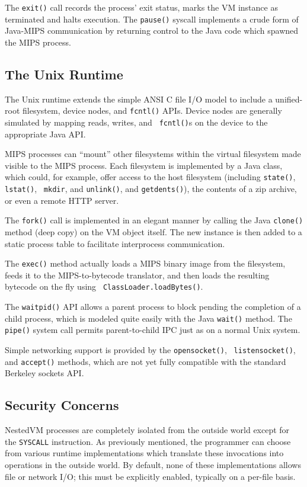 \documentclass{acmconf}
\begin{document}
The {\tt exit()} call records the process' exit status, marks the VM
instance as terminated and halts execution.  The {\tt pause()} syscall
implements a crude form of Java-MIPS communication by returning
control to the Java code which spawned the MIPS process.


\subsection{The Unix Runtime}

The Unix runtime extends the simple ANSI C file I/O model to include a
unified-root filesystem, device nodes, and {\tt fcntl()} APIs.  Device
nodes are generally simulated by mapping reads, writes, and {\tt
fcntl()}s on the device to the appropriate Java API.

MIPS processes can ``mount'' other filesystems within the virtual
filesystem made visible to the MIPS process.  Each filesystem is
implemented by a Java class, which could, for example, offer access to
the host filesystem (including {\tt state()}, {\tt lstat()}, {\tt
mkdir}, and {\tt unlink()}, and {\tt getdents()}), the contents of a
zip archive, or even a remote HTTP server.

The {\tt fork()} call is implemented in an elegant manner by calling
the Java {\tt clone()} method (deep copy) on the VM object itself.
The new instance is then added to a static process table to facilitate
interprocess communication.

The {\tt exec()} method actually loads a MIPS binary image from the
filesystem, feeds it to the MIPS-to-bytecode translator, and then
loads the resulting bytecode on the fly using {\tt
ClassLoader.loadBytes()}.

The {\tt waitpid()} API allows a parent process to block pending the
completion of a child process, which is modeled quite easily with the
Java {\tt wait()} method.  The {\tt pipe()} system call permits
parent-to-child IPC just as on a normal Unix system.

Simple networking support is provided by the {\tt opensocket()}, {\tt
listensocket()}, and {\tt accept()} methods, which are not yet fully
compatible with the standard Berkeley sockets API.


\subsection{Security Concerns}

NestedVM processes are completely isolated from the outside world
except for the {\tt SYSCALL} instruction.  As previously mentioned,
the programmer can choose from various runtime implementations which
translate these invocations into operations in the outside world.  By
default, none of these implementations allows file or network I/O;
this must be explicitly enabled, typically on a per-file basis.
\end{document}

